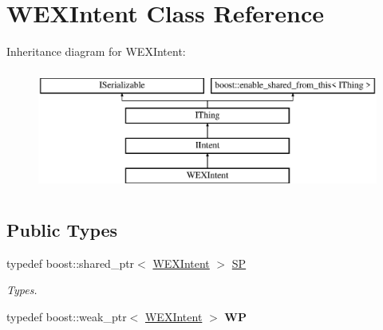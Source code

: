 \hypertarget{class_w_e_x_intent}{}\section{W\+E\+X\+Intent Class Reference}
\label{class_w_e_x_intent}
Inheritance diagram for W\+E\+X\+Intent\+:\begin{figure}[H]
\begin{center}
\leavevmode
\includegraphics[height=4.000000cm]{class_w_e_x_intent}
\end{center}
\end{figure}
\subsection*{Public Types}
\begin{DoxyCompactItemize}
\item 
\mbox{\label{class_w_e_x_intent_a5da0edc3c83b684a52891ea2ecb62fb0}} 
typedef boost\+::shared\+\_\+ptr$<$ \hyperlink{class_w_e_x_intent}{W\+E\+X\+Intent} $>$ \hyperlink{class_w_e_x_intent_a5da0edc3c83b684a52891ea2ecb62fb0}{SP}
\begin{DoxyCompactList}\small\item\em Types. \end{DoxyCompactList}\item 
\mbox{\label{class_w_e_x_intent_aeb00190e3f8fef8c5da5b8ad8d2476b6}} 
typedef boost\+::weak\+\_\+ptr$<$ \hyperlink{class_w_e_x_intent}{W\+E\+X\+Intent} $>$ {\bfseries WP}
\end{DoxyCompactItemize}
